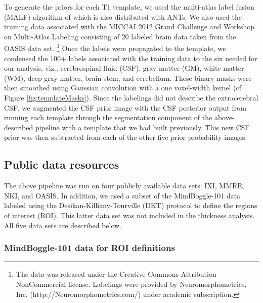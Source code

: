 To generate the priors for each T1 template, we used the multi-atlas label fusion (MALF) 
algorithm of \cite{wang2013} which is also distributed with ANTs.
We also used the training data associated with the 
MICCAI 2012 Grand Challenge and Workshop on Multi-Atlas Labeling
consisting of 20 labeled brain data taken from the OASIS data set.%
\footnote{
The data was released under the Creative Commons Attribution-NonCommercial license. 
Labelings were provided by Neuromorphometrics, Inc. (http://Neuromorphometrics.com/) 
under academic subscription.
}
Once the labels were propagated to the template, we condensed the 100+ labels associated
with the training data to the six needed for our analysis, viz., cerebrospinal fluid (CSF), 
gray matter (GM), white matter (WM), deep gray matter, brain stem, and cerebellum.  These binary
masks were then smoothed using Gaussian convolution with a one voxel-width kernel (cf
Figure \ref{fig:templateMasks}).  Since the labelings did not describe the extracerebral
CSF, we augmented the CSF prior image with the CSF posterior output from running each template 
through the segmentation component of the above-described pipeline with a template 
that we had built previously.  This new CSF prior was then subtracted from each of the
other five prior probability images.

\subsection{Public data resources}

The above pipeline was run on four publicly available data sets:
IXI, MMRR, NKI, and OASIS. 
In addition, we used a subset of the MindBoggle-101 data
labeled using the 
Desikan-Killiany-Tourville (DKT) protocol \citep{klein2012} to define the
regions of interest (ROI).  This latter data set was not included in the 
thickness analysis.
All five data sets are described below.

\subsubsection{MindBoggle-101 data for ROI definitions}

